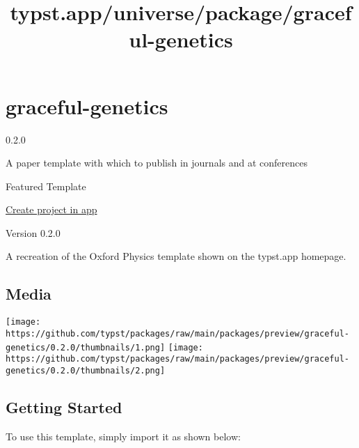 \title{typst.app/universe/package/graceful-genetics}

\label{banner}
\label{template-thumbnail}

\section{graceful-genetics}\label{graceful-genetics}

{ 0.2.0 }

A paper template with which to publish in journals and at conferences

{ } Featured Template

\href{/app?template=graceful-genetics&version=0.2.0}{Create project in
app}

\label{readme}
Version 0.2.0

A recreation of the Oxford Physics template shown on the typst.app
homepage.

\subsection{Media}\label{media}

\texttt{[image: https://github.com/typst/packages/raw/main/packages/preview/graceful-genetics/0.2.0/thumbnails/1.png]}
\texttt{[image: https://github.com/typst/packages/raw/main/packages/preview/graceful-genetics/0.2.0/thumbnails/2.png]}

\subsection{Getting Started}\label{getting-started}

To use this template, simply import it as shown below:

